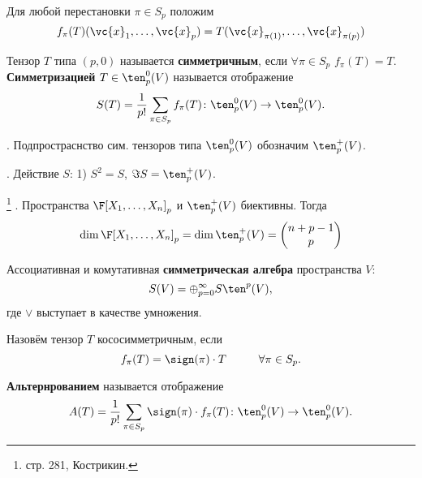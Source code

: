Для любой перестановки $\pi \in S_p$ положим 
\begin{equation}
    f_{\pi}(T)(\vc{x}_1, \dots, \vc{x}_p) = T(\vc{x}_{\pi(1)}, \dots, \vc{x}_{\pi(p)})
\end{equation}
\begin{to_def}
    Тензор $T$ типа $(p, 0)$ называется \textbf{симметричным}, если $\forall \pi \in S_p$ $f_{\pi}(T) = T$. \textbf{Симметризацией} $T \in \ten^0_p (V)$ называется отображение
    \begin{equation}
        S(T) = \frac{1}{p!} \sum_{\pi \in S_p} f_{\pi} (T) \colon  \ten^0_p (V) \to \ten^0_p (V).
    \end{equation}
\end{to_def}

\noindent
\socrat. Подпростраснство сим. тензоров типа $\ten^0_p (V)$ обозначим $\ten^+_p (V)$.

\noindent
\socrat. Действие $S$: 1) $S^2 = S$, $\Im S = \ten^+_p (V)$.

\noindent
\socrat\footnote{
    стр. 281, Кострикин.
}
. Пространства $\F[X_1, \dots, X_n]_p$ и $\ten^+_p (V)$ биективны. Тогда
\begin{equation}
    \dim \F[X_1, \dots, X_n]_p = \dim \ten^+_p (V) = 
    \begin{pmatrix}
        n+p-1 \\ p
    \end{pmatrix}
\end{equation}

\begin{to_def}
    Ассоциативная и комутативная \textbf{симметрическая алгебра} пространства $V$:
    \begin{equation}
        S(V) = \oplus_{p=0}^{\infty} S\ten^p (V),
    \end{equation}
    где $\vee$ выступает в качестве умножения.

\end{to_def}


\begin{to_def}
    Назовём тензор $T$ кососимметричным, если 
    \begin{equation}
        f_{\pi}(T) = \sign(\pi) \cdot T \hspace{1cm} \forall \pi \in S_p.
    \end{equation}
\end{to_def}

\begin{to_def}
    \textbf{Альтернрованием} называется отображение
    \begin{equation}
        A(T) = \frac{1}{p!} \sum_{\pi \in S_p} \sign(\pi) \cdot f_{\pi} (T) \colon  \ten^0_p (V) \to \ten^0_p (V).
    \end{equation}
\end{to_def}

